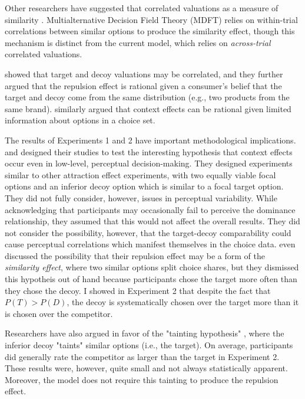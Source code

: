 Other researchers have suggested that correlated valuations as a measure of similarity \parencite{kamakura1984predicting,natenzon2019random}. Multialternative Decision Field Theory (MDFT) \parencite{roeMultialternativeDecisionField2001a} relies on within-trial correlations between similar options to produce the similarity effect, though this mechanism is distinct from the current model, which relies on \textit{across-trial} correlated valuations. 

\textcite{bhui2021rational} showed that target and decoy valuations may be correlated, and they further argued that the repulsion effect is rational given a consumer's belief that the target and decoy come from the same distribution (e.g., two products from the same brand). \textcite{bhui2024context} similarly argued that context effects can be rational given limited information about options in a choice set. 

The results of Experiments 1 and 2 have important methodological implications. \textcite{trueblood2013not} and \textcite{spektorWhenGoodLooks2018b} designed their studies to test the interesting hypothesis that context effects occur even in low-level, perceptual decision-making. They designed experiments similar to other attraction effect experiments, with two equally viable focal options and an inferior decoy option which is similar to a focal target option. They did not fully consider, however, issues in perceptual variability. While acknowledging that participants may occasionally fail to perceive the dominance relationship, they assumed that this would not affect the overall results. They did not consider the possibility, however, that the target-decoy comparability could cause perceptual correlations which manifest themselves in the choice data. \textcite{spektorWhenGoodLooks2018b} even discussed the possibility that their repulsion effect may be a form of the \textit{similarity effect}, where two similar options split choice shares, but they dismissed this hypotheis out of hand because participants chose the target more often than they chose the decoy. I showed in Experiment 2 that despite the fact that $P(T)>P(D)$, the decoy is systematically chosen over the target more than it is chosen over the competitor. 

Researchers have also argued in favor of the "tainting hypothesis" \parencite{simonson2014vices,spektorWhenGoodLooks2018b}, where the inferior decoy "taints" similar options (i.e., the target). On average, participants did generally rate the competitor as larger than the target in Experiment 2. These results were, however, quite small and not always statistically apparent. Moreover, the model does not require this tainting to produce the repulsion effect.

